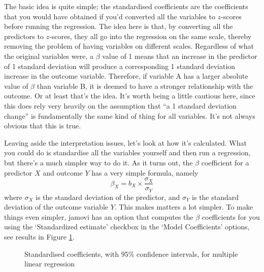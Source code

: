 The basic idea is quite simple; the standardised coefficients are the coefficients that you would have obtained if you'd converted all the variables to $z$-scores before running the regression.  The idea here is that, by converting all the predictors to $z$-scores, they all go into the regression on the same scale, thereby removing the problem of having variables on different scales. Regardless of what the original variables were, a $\beta$ value of 1 means that an increase in the predictor of 1 standard deviation will produce a corresponding 1 standard deviation increase in the outcome variable. Therefore, if variable A has a larger absolute value of $\beta$ than variable B, it is deemed to have a stronger relationship with the outcome. Or at least that's the idea. It's worth being a little cautious here, since this does rely very heavily on the assumption that ``a 1 standard deviation change'' is fundamentally the same kind of thing for all variables. It's not always obvious that this is true.  

Leaving aside the interpretation issues, let's look at how it's calculated. What you could do is standardise all the variables yourself and then run a regression, but there's a much simpler way to do it. As it turns out, the $\beta$ coefficient for a predictor $X$ and outcome $Y$ has a very simple formula, namely
$$
\beta_X = b_X \times \frac{\sigma_X}{\sigma_Y} 
$$
where $\sigma_X$ is the standard deviation of the predictor, and $\sigma_Y$ is the standard deviation of the outcome variable $Y$. This makes matters a lot simpler. To make things even simpler, jamovi has an option that computes the $\beta$ coefficients for you using the `Standardized estimate' checkbox in the `Model Coefficients' options, see results in Figure \ref{fig:reg3}. 

\begin{figure}[!htb]
\begin{center}
\caption{Standardised coefficients, with 95\% confidence intervals, for multiple linear regression}
\HR
\label{fig:reg3}
\end{center}
\end{figure}

